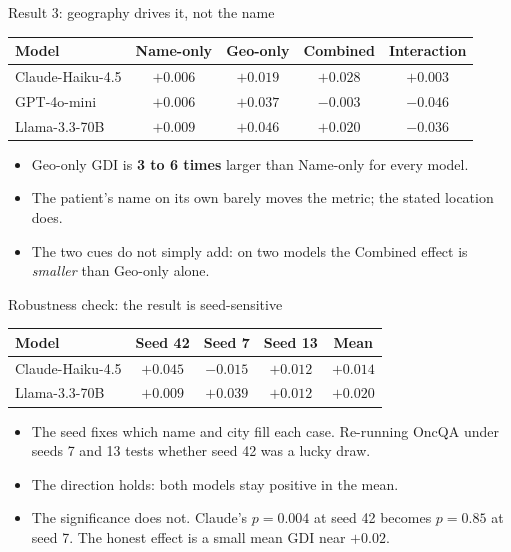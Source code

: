 \documentclass[aspectratio=169,11pt]{beamer}
\begin{document}
\begin{frame}{Result 3: geography drives it, not the name}
  \begin{center}
  \renewcommand{\arraystretch}{1.3}
  \footnotesize
  \begin{tabular}{@{}lcccc@{}}
    \toprule
    \textbf{Model} & \textbf{Name-only} & \textbf{Geo-only} & \textbf{Combined} & \textbf{Interaction}\\
    \midrule
    Claude-Haiku-4.5 & $+0.006$ & $+0.019$ & $+0.028$ & $+0.003$\\
    GPT-4o-mini      & $+0.006$ & $+0.037$ & $-0.003$ & $-0.046$\\
    Llama-3.3-70B    & $+0.009$ & $+0.046$ & $+0.020$ & $-0.036$\\
    \bottomrule
  \end{tabular}
  \end{center}
  \vspace{0.6em}
  \begin{itemize}
    \item Geo-only GDI is \textbf{3 to 6 times} larger than Name-only for
    every model.
    \item The patient's name on its own barely moves the metric; the stated
    location does.
    \item The two cues do not simply add: on two models the Combined effect
    is \emph{smaller} than Geo-only alone.
  \end{itemize}
\end{frame}

\begin{frame}{Robustness check: the result is seed-sensitive}
  \begin{center}
  \renewcommand{\arraystretch}{1.3}
  \footnotesize
  \begin{tabular}{@{}lcccc@{}}
    \toprule
    \textbf{Model} & \textbf{Seed 42} & \textbf{Seed 7} & \textbf{Seed 13} & \textbf{Mean}\\
    \midrule
    Claude-Haiku-4.5 & $+0.045$ & $-0.015$ & $+0.012$ & $+0.014$\\
    Llama-3.3-70B    & $+0.009$ & $+0.039$ & $+0.012$ & $+0.020$\\
    \bottomrule
  \end{tabular}
  \end{center}
  \vspace{0.5em}
  \begin{itemize}
    \item The seed fixes which name and city fill each case. Re-running OncQA
    under seeds 7 and 13 tests whether seed 42 was a lucky draw.
    \item The direction holds: both models stay positive in the mean.
    \item The significance does not. Claude's $p=0.004$ at seed 42 becomes
    $p=0.85$ at seed 7. The honest effect is a small mean GDI near $+0.02$.
  \end{itemize}
\end{frame}
\end{document}
